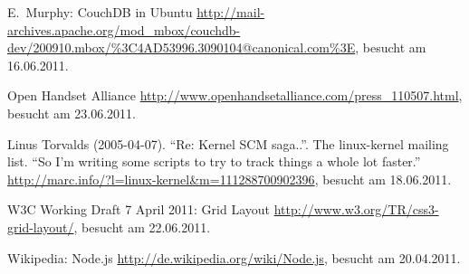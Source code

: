 \begin{thebibliography}{99}
	E.\ Murphy:
	CouchDB in Ubuntu
	\url{http://mail-archives.apache.org/mod_mbox/couchdb-dev/200910.mbox/%3C4AD53996.3090104@canonical.com%3E}, besucht am 16.06.2011.

  Open Handset Alliance
    \url{http://www.openhandsetalliance.com/press_110507.html}, besucht am 23.06.2011.

	Linus Torvalds (2005-04-07).
	``Re: Kernel SCM saga..''.
	The linux-kernel mailing list. ``So I'm writing some scripts to try to track
	things a whole lot faster.''
	\url{http://marc.info/?l=linux-kernel&m=111288700902396}, besucht am 18.06.2011.

	W3C Working Draft 7 April 2011:
	Grid Layout
	\url{http://www.w3.org/TR/css3-grid-layout/}, besucht am 22.06.2011.

  Wikipedia: Node.js
    \url{http://de.wikipedia.org/wiki/Node.js}, besucht am 20.04.2011.
	
\end{thebibliography}